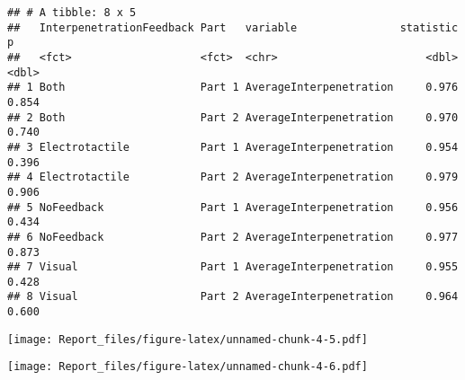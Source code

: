 \documentclass[
]{article}
\newenvironment{Shaded}{\begin{snugshade}}{\end{snugshade}}
\newcommand{\DataTypeTok}[1]{\textcolor[rgb]{0.13,0.29,0.53}{#1}}
\newcommand{\KeywordTok}[1]{\textcolor[rgb]{0.13,0.29,0.53}{\textbf{#1}}}
\newcommand{\NormalTok}[1]{#1}
\newcommand{\OperatorTok}[1]{\textcolor[rgb]{0.81,0.36,0.00}{\textbf{#1}}}
\newcommand{\StringTok}[1]{\textcolor[rgb]{0.31,0.60,0.02}{#1}}
\begin{document}
\begin{verbatim}
## # A tibble: 8 x 5
##   InterpenetrationFeedback Part   variable                statistic     p
##   <fct>                    <fct>  <chr>                       <dbl> <dbl>
## 1 Both                     Part 1 AverageInterpenetration     0.976 0.854
## 2 Both                     Part 2 AverageInterpenetration     0.970 0.740
## 3 Electrotactile           Part 1 AverageInterpenetration     0.954 0.396
## 4 Electrotactile           Part 2 AverageInterpenetration     0.979 0.906
## 5 NoFeedback               Part 1 AverageInterpenetration     0.956 0.434
## 6 NoFeedback               Part 2 AverageInterpenetration     0.977 0.873
## 7 Visual                   Part 1 AverageInterpenetration     0.955 0.428
## 8 Visual                   Part 2 AverageInterpenetration     0.964 0.600
\end{verbatim}

\begin{Shaded}
\end{Shaded}

\texttt{[image: Report\_files/figure-latex/unnamed-chunk-4-5.pdf]}

\begin{Shaded}
\end{Shaded}

\texttt{[image: Report\_files/figure-latex/unnamed-chunk-4-6.pdf]}

\begin{Shaded}
\end{Shaded}
\end{document}
